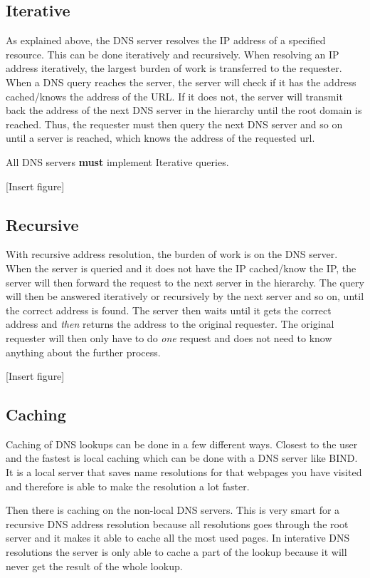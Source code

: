 \subsection{Iterative}
As explained above, the DNS server resolves the IP address of a specified resource. This can be done iteratively and recursively.
When resolving an IP address iteratively, the largest burden of work is transferred to the requester. 
When a DNS query reaches the server, the server will check if it has the address cached/knows the address of the URL. If it does not, the server will transmit back the address of the next DNS server in the hierarchy until the root domain is reached.
Thus, the requester must then query the next DNS server and so on until a server is reached, which knows the address of the requested url.

All DNS servers \textbf{must} implement Iterative queries.

[Insert figure]

\subsection{Recursive}
With recursive address resolution, the burden of work is on the DNS server. When the server is queried and it does not have the IP cached/know the IP, the server will then forward the request to the next server in the hierarchy. The query will then be answered iteratively or recursively by the next server and so on, until the correct address is found.
The server then waits until it gets the correct address and \textit{then} returns the address to the original requester. The original requester will then only have to do \textit{one} request and does not need to know anything about the further process. 

[Insert figure]

\subsection{Caching}
Caching of DNS lookups can be done in a few different ways. Closest to the user and the fastest is local caching which can be done with a DNS server like BIND. It is a local server that saves name resolutions for that webpages you have visited and therefore is able to make the resolution a lot faster.

Then there is caching on the non-local DNS servers. This is very smart for a recursive DNS address resolution because all resolutions goes through the root server and it makes it able to cache all the most used pages. In interative DNS resolutions the server is only able to cache a part of the lookup because it will never get the result of the whole lookup.

